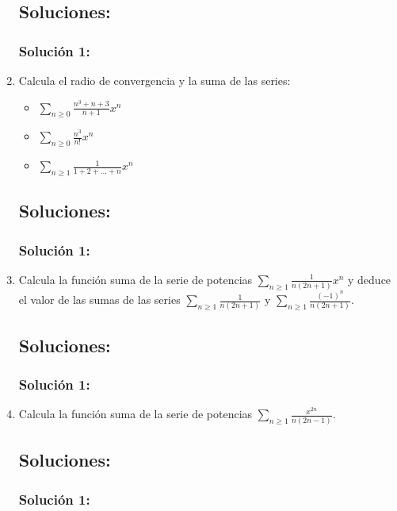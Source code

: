 \documentclass[a4paper, 11pt]{article} %
\begin{document}
\begin{enumerate}
	\subsection*{Soluciones:}
		\subsubsection*{Solución 1:}
	
	\item Calcula el radio de convergencia y la suma de las series:
	\begin{itemize}
		\item $\displaystyle{\sum_{n \geq 0} \frac{n^3+n+3}{n+1}x^n}$
		\item $\displaystyle{\sum_{n \geq 0} \frac{n^3}{n!}x^n}$
		\item $\displaystyle{\sum_{n \geq 1} \frac{1}{1 + 2 + \dots + n}x^n}$
	\end{itemize}
	\subsection*{Soluciones:}
		\subsubsection*{Solución 1:}
	
	\item Calcula la función suma de la serie de potencias $\displaystyle{\sum_{n \geq 1} \frac{1}{n(2n+1)}x^n}$ y
	deduce el valor de las sumas de las series $\displaystyle{\sum_{n \geq 1} \frac{1}{n(2n+1)}}$ y
	$\displaystyle{\sum_{n \geq 1} \frac{(-1)^n}{n(2n+1)}}$.
	\subsection*{Soluciones:}
		\subsubsection*{Solución 1:}
	
	\item Calcula la función suma de la serie de potencias $\displaystyle{\sum_{n \geq 1} \frac{x^{2n}}{n(2n-1)}}$.
	\subsection*{Soluciones:}
		\subsubsection*{Solución 1:}
	

\end{enumerate}
\end{document}
